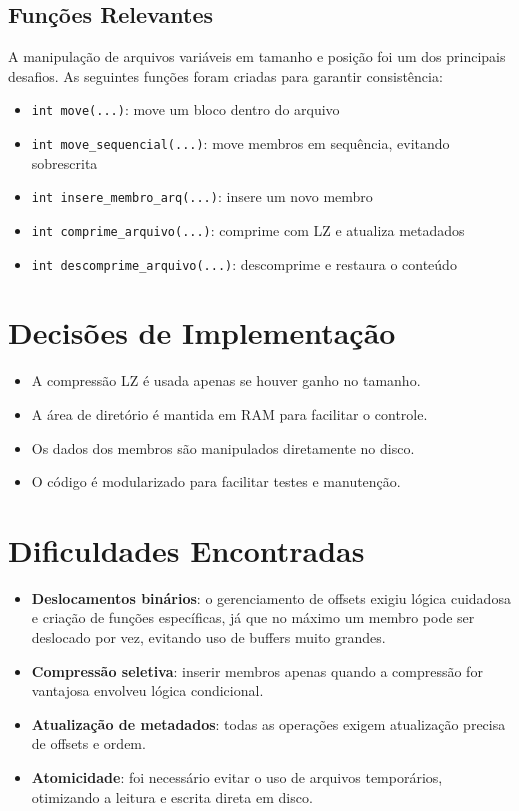 \documentclass[12pt]{article}
\begin{document}
\subsection*{Funções Relevantes}

A manipulação de arquivos variáveis em tamanho e posição foi um dos principais desafios. As seguintes funções foram criadas para garantir consistência:

\begin{itemize}
    \item \texttt{int move(...)}: move um bloco dentro do arquivo
    \item \texttt{int move\_sequencial(...)}: move membros em sequência, evitando sobrescrita
    \item \texttt{int insere\_membro\_arq(...)}: insere um novo membro
    \item \texttt{int comprime\_arquivo(...)}: comprime com LZ e atualiza metadados
    \item \texttt{int descomprime\_arquivo(...)}: descomprime e restaura o conteúdo
\end{itemize}

\section*{Decisões de Implementação}

\begin{itemize}
    \item A compressão LZ é usada apenas se houver ganho no tamanho.
    \item A área de diretório é mantida em RAM para facilitar o controle.
    \item Os dados dos membros são manipulados diretamente no disco.
    \item O código é modularizado para facilitar testes e manutenção.
\end{itemize}

\section*{Dificuldades Encontradas}

\begin{itemize}
    \item \textbf{Deslocamentos binários}: o gerenciamento de offsets exigiu lógica cuidadosa e criação de funções específicas, já que no máximo um membro pode ser deslocado por vez, evitando uso de buffers muito grandes.
    \item \textbf{Compressão seletiva}: inserir membros apenas quando a compressão for vantajosa envolveu lógica condicional.
    \item \textbf{Atualização de metadados}: todas as operações exigem atualização precisa de offsets e ordem.
    \item \textbf{Atomicidade}: foi necessário evitar o uso de arquivos temporários, otimizando a leitura e escrita direta em disco.
\end{itemize}
\end{document}
